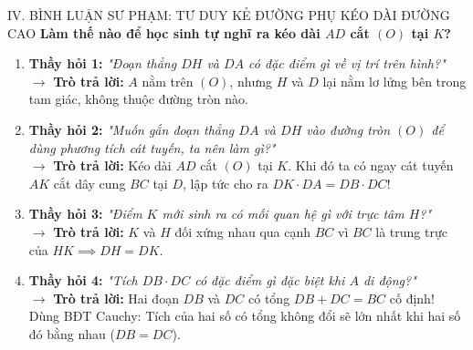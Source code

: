\documentclass[11pt,a4paper]{article}
\begin{document}
\newpage

\begin{pedagogybox}{IV. BÌNH LUẬN SƯ PHẠM: TƯ DUY KẺ ĐƯỜNG PHỤ KÉO DÀI ĐƯỜNG CAO}
\textbf{Làm thế nào để học sinh tự nghĩ ra kéo dài $AD$ cắt $(O)$ tại $K$?}
\begin{enumerate}[leftmargin=5mm]
    \item \textbf{Thầy hỏi 1:} \textit{"Đoạn thẳng $DH$ và $DA$ có đặc điểm gì về vị trí trên hình?"}\\
    $\to$ \textbf{Trò trả lời:} $A$ nằm trên $(O)$, nhưng $H$ và $D$ lại nằm lơ lửng bên trong tam giác, không thuộc đường tròn nào.
    \item \textbf{Thầy hỏi 2:} \textit{"Muốn gắn đoạn thẳng $DA$ và $DH$ vào đường tròn $(O)$ để dùng phương tích cát tuyến, ta nên làm gì?"}\\
    $\to$ \textbf{Trò trả lời:} Kéo dài $AD$ cắt $(O)$ tại $K$. Khi đó ta có ngay cát tuyến $AK$ cắt dây cung $BC$ tại $D$, lập tức cho ra $DK \cdot DA = DB \cdot DC$!
    \item \textbf{Thầy hỏi 3:} \textit{"Điểm $K$ mới sinh ra có mối quan hệ gì với trực tâm $H$?"}\\
    $\to$ \textbf{Trò trả lời:} $K$ và $H$ đối xứng nhau qua cạnh $BC$ vì $BC$ là trung trực của $HK \implies DH = DK$.
    \item \textbf{Thầy hỏi 4:} \textit{"Tích $DB \cdot DC$ có đặc điểm gì đặc biệt khi $A$ di động?"}\\
    $\to$ \textbf{Trò trả lời:} Hai đoạn $DB$ và $DC$ có tổng $DB + DC = BC$ cố định! Dùng BĐT Cauchy: Tích của hai số có tổng không đổi sẽ lớn nhất khi hai số đó bằng nhau ($DB = DC$).
\end{enumerate}
\end{pedagogybox}

\vspace{1.5mm}
\end{document}
